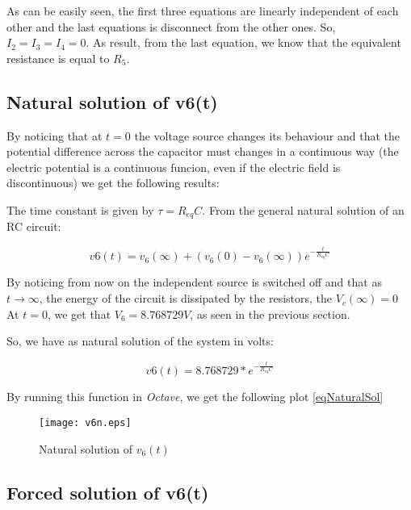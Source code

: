 \hfill


As can be easily seen, the first three equations are linearly independent of each other and the last equations is disconnect from the other ones. So, $I_2 = I_3 = I_4 = 0$. As result, from the last equation, we know that
the equivalent resistance is equal to $R_5$.




\subsection{Natural solution of v6(t)}

By noticing that at $t = 0$ the voltage source changes its behaviour and that the potential difference across the capacitor must changes in a continuous way (the electric potential is a continuous funcion, even  if the electric field is discontinuous)
we get the following results:

The time constant is given by $\tau = R_{eq}C$.
From the general natural solution of an RC circuit:

\begin{equation}
  v6 (t) = v_6(\infty) + (v_6(0) - v_6(\infty)) e^{-\frac{t}{R_{eq}C}}
\end{equation}


By noticing from now on the independent source is switched off and that as $t \rightarrow \infty$, the energy of the circuit is dissipated by the resistors, the $V_c(\infty) = 0$
At $t = 0$, we get that $V_6 = 8.768729V$, as seen in the previous section.

So, we have as natural solution of the system in volts:

\begin{equation}
  v6 (t) = 8.768729*e^{-\frac{t}{R_{eq}C}}
  \label{eqNaturalSol}
\end{equation}

By running this function in \textit{Octave}, we get the following plot \ref{eqNaturalSol}

\begin{figure}[h] \centering
  \texttt{[image: v6n.eps]}
  \caption{Natural solution of $v_6(t)$ }
  \label{fig:naturalSolution}
\end{figure}


\subsection{Forced solution of v6(t)}

